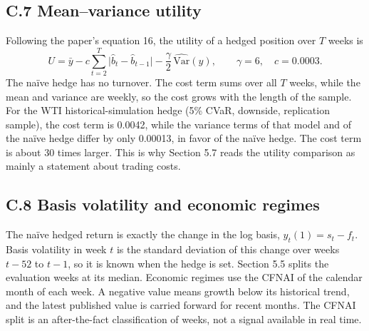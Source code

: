 \documentclass[11pt,letterpaper]{article}
\begin{document}
\subsection*{C.7 Mean--variance utility}

Following the paper's equation 16, the utility of a hedged position over $T$ weeks is
\begin{equation}
U = \bar y - c\sum_{t=2}^{T}\big|\hat b_t - \hat b_{t-1}\big| - \frac{\gamma}{2}\,\widehat{\mathrm{Var}}(y), \qquad \gamma = 6, \quad c = 0.0003 .
\end{equation}
The naïve hedge has no turnover. The cost term sums over all $T$ weeks, while the mean and variance are weekly, so the cost grows with the length of the sample. For the WTI historical-simulation hedge (5\% CVaR, downside, replication sample), the cost term is 0.0042, while the variance terms of that model and of the naïve hedge differ by only 0.00013, in favor of the naïve hedge. The cost term is about 30 times larger. This is why Section 5.7 reads the utility comparison as mainly a statement about trading costs.

\subsection*{C.8 Basis volatility and economic regimes}

The naïve hedged return is exactly the change in the log basis, $y_t(1) = s_t - f_t$. Basis volatility in week $t$ is the standard deviation of this change over weeks $t-52$ to $t-1$, so it is known when the hedge is set. Section 5.5 splits the evaluation weeks at its median. Economic regimes use the CFNAI of the calendar month of each week. A negative value means growth below its historical trend, and the latest published value is carried forward for recent months. The CFNAI split is an after-the-fact classification of weeks, not a signal available in real time.
\par\endgroup
\end{document}
